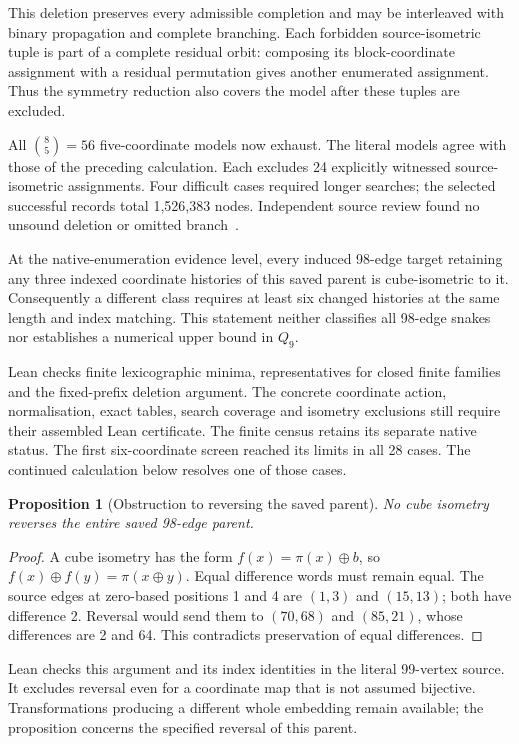 \documentclass[11pt,a4paper]{article}
\newtheorem{proposition}[theorem]{Proposition}
\theoremstyle{definition}
\theoremstyle{remark}
\begin{document}
This deletion preserves every admissible completion and may be
interleaved with binary propagation and complete branching. Each
forbidden source-isometric tuple is part of a complete residual
orbit: composing its block-coordinate assignment with a residual
permutation gives another enumerated assignment. Thus the symmetry
reduction also covers the model after these tuples are excluded.

All $\binom85=56$ five-coordinate models now exhaust. The literal
models agree with those of the preceding calculation. Each excludes
24 explicitly witnessed source-isometric assignments. Four difficult
cases required longer searches; the selected successful records
total 1,526,383 nodes. Independent source review found no unsound
deletion or omitted branch~\cite{research207}.

At the native-enumeration evidence level, every induced 98-edge
target retaining any three indexed coordinate histories of this
saved parent is cube-isometric to it. Consequently a different
class requires at least six changed histories at the same length
and index matching. This statement neither classifies all 98-edge
snakes nor establishes a numerical upper bound in $Q_9$.

Lean checks finite lexicographic minima, representatives for closed
finite families and the fixed-prefix deletion argument. The concrete
coordinate action, normalisation, exact tables, search coverage and
isometry exclusions still require their assembled Lean certificate.
The finite census retains its separate native status. The first
six-coordinate screen reached its limits in all 28 cases. The
continued calculation below resolves one of those cases.

\begin{proposition}[Obstruction to reversing the saved parent]
No cube isometry reverses the entire saved 98-edge parent.
\end{proposition}
\begin{proof}
A cube isometry has the form $f(x)=\pi(x)\oplus b$, so
$f(x)\oplus f(y)=\pi(x\oplus y)$. Equal difference words must
remain equal. The source edges at zero-based positions 1 and 4
are $(1,3)$ and $(15,13)$; both have difference 2. Reversal would
send them to $(70,68)$ and $(85,21)$, whose differences are 2 and
64. This contradicts preservation of equal differences.
\end{proof}
Lean checks this argument and its index identities in the literal
99-vertex source. It excludes reversal even for a coordinate map
that is not assumed bijective. Transformations producing a different
whole embedding remain available; the proposition concerns the
specified reversal of this parent.
\end{document}
